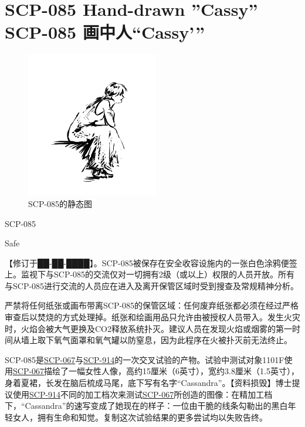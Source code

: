 \chapter[SCP-085 画中人“Cassy'”]{
    SCP-085 Hand-drawn ''Cassy''\\
    SCP-085 画中人“Cassy'”
}

\label{chap:SCP-085}

\begin{figure}[H]
    \centering
    \includegraphics[width=0.5\linewidth]{images/SCP-085.png}
    \caption*{SCP-085的静态图}
\end{figure}

SCP-085

Safe

【修订于██-██-████】。SCP-085被保存在安全收容设施内的一张白色涂鸦便签上。监视下与SCP-085的交流仅对一切拥有2级（或以上）权限的人员开放。所有与SCP-085进行交流的人员应在进入及离开保管区域时受到搜查及常规精神分析。

严禁将任何纸张或画布带离SCP-085的保管区域：任何废弃纸张都必须在经过严格审查后以焚烧的方式处理掉。纸张和绘画用品只允许由被授权人员带入。发生火灾时，火焰会被大气更换及CO2释放系统扑灭。建议人员在发现火焰或烟雾的第一时间从墙上取下氧气面罩和氧气罐以防窒息，因为此程序在火被扑灭前无法终止。

SCP-085是\hyperref[chap:SCP-067]{SCP-067}与\hyperref[chap:SCP-914]{SCP-914}的一次交叉试验的产物。试验中测试对象1101F使用\hyperref[chap:SCP-067]{SCP-067}描绘了一幅女性人像，高约15厘米（6英寸），宽约3.8厘米（1.5英寸），身着夏裙，长发在脑后梳成马尾，底下写有名字“Cassandra”。【资料损毁】博士提议使用\hyperref[chap:SCP-914]{SCP-914}不同的加工档次来测试\hyperref[chap:SCP-067]{SCP-067}所创造的图像：在精加工档下，“Cassandra”的速写变成了她现在的样子：一位由干脆的线条勾勒出的黑白年轻女人，拥有生命和知觉。复制这次试验结果的更多尝试均以失败告终。

